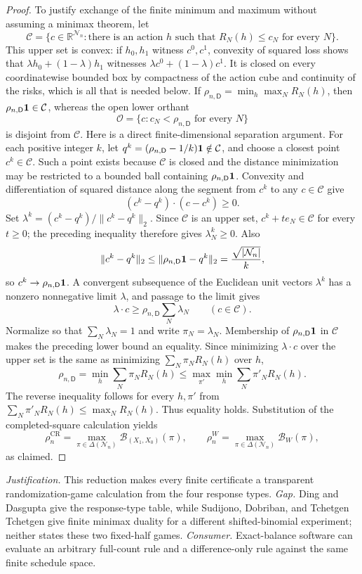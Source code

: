 \documentclass{article}
\begin{document}
\begin{proof}
To justify exchange of the finite minimum and maximum without assuming a minimax theorem, let
\[
 \mathcal C=\{c\in\mathbb R^{\mathcal N_n}:\text{there is an action }h
 \text{ such that }R_N(h)\leq c_N\text{ for every }N\}.
\]
This upper set is convex: if \(h_0,h_1\) witness \(c^0,c^1\), convexity of squared loss shows that \(\lambda h_0+(1-\lambda)h_1\) witnesses \(\lambda c^0+(1-\lambda)c^1\).  It is closed on every coordinatewise bounded box by compactness of the action cube and continuity of the risks, which is all that is needed below.  If \(\rho_{n,\mathsf D}=\min_h\max_NR_N(h)\), then \(\rho_{n,\mathsf D}{\bf1}\in\mathcal C\), whereas the open lower orthant
\[
 \mathcal O=\{c:c_N<\rho_{n,\mathsf D}\text{ for every }N\}
\]
is disjoint from \(\mathcal C\).  Here is a direct finite-dimensional separation argument.  For each positive integer \(k\), let \(q^k=(\rho_{n,\mathsf D}-1/k){\bf1}\notin\mathcal C\), and choose a closest point \(c^k\in\mathcal C\).  Such a point exists because \(\mathcal C\) is closed and the distance minimization may be restricted to a bounded ball containing \(\rho_{n,\mathsf D}{\bf1}\).  Convexity and differentiation of squared distance along the segment from \(c^k\) to any \(c\in\mathcal C\) give
\[
 (c^k-q^k)\mathbin{\cdot}(c-c^k)\geq0.
\]
Set \(\lambda^k=(c^k-q^k)/\lVert c^k-q^k\rVert_2\).  Since \(\mathcal C\) is an upper set, \(c^k+t e_N\in\mathcal C\) for every \(t\geq0\); the preceding inequality therefore gives \(\lambda_N^k\geq0\).  Also
\[
 \lVert c^k-q^k\rVert_2
 \leq\lVert\rho_{n,\mathsf D}{\bf1}-q^k\rVert_2
 =\frac{\sqrt{|\mathcal N_n|}}{k},
\]
so \(c^k\to\rho_{n,\mathsf D}{\bf1}\).  A convergent subsequence of the Euclidean unit vectors \(\lambda^k\) has a nonzero nonnegative limit \(\lambda\), and passage to the limit gives
\[
 \lambda\mathbin{\cdot}c\geq
 \rho_{n,\mathsf D}\sum_N\lambda_N\qquad(c\in\mathcal C).
\]
Normalize so that \(\sum_N\lambda_N=1\) and write \(\pi_N=\lambda_N\).  Membership of \(\rho_{n,\mathsf D}{\bf1}\) in \(\mathcal C\) makes the preceding lower bound an equality.  Since minimizing \(\lambda\mathbin{\cdot}c\) over the upper set is the same as minimizing \(\sum_N\pi_NR_N(h)\) over \(h\),
\[
 \rho_{n,\mathsf D}=\min_h\sum_N\pi_NR_N(h)
 \leq \max_{\pi'}\min_h\sum_N\pi'_NR_N(h).
\]
The reverse inequality follows for every \(h,\pi'\) from
\(
 \sum_N\pi'_NR_N(h)\leq\max_NR_N(h)
\).
Thus equality holds.  Substitution of the completed-square calculation yields
\[
 \rho_n^{\mathrm{CR}}=\max_{\pi\in\Delta(\mathcal N_n)}
 \mathcal B_{(X_1,X_0)}(\pi),\qquad
 \rho_n^W=\max_{\pi\in\Delta(\mathcal N_n)}\mathcal B_W(\pi),
\]
as claimed.
\end{proof}
\par\smallskip\noindent \textit{Justification.} This reduction makes every finite certificate a transparent randomization-game calculation from the four response types. \textit{Gap.} Ding and Dasgupta give the response-type table, while Sudijono, Dobriban, and Tchetgen Tchetgen give finite minimax duality for a different shifted-binomial experiment; neither states these two fixed-half games. \textit{Consumer.} Exact-balance software can evaluate an arbitrary full-count rule and a difference-only rule against the same finite schedule space.
\end{document}
